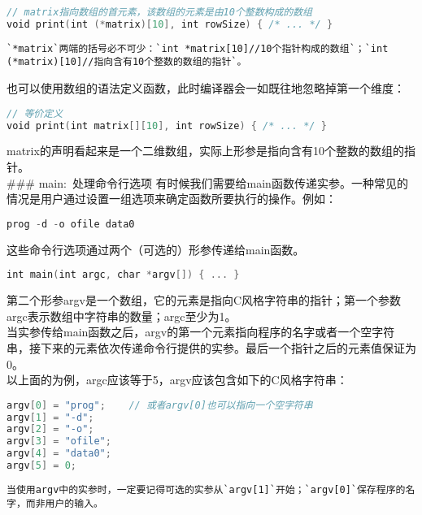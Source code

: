 \documentclass[
  a4paper,
  oneside,tablecaptionabove
]{scrbook}
\begin{document}
\begin{lstlisting}[language={C++}]
// matrix指向数组的首元素，该数组的元素是由10个整数构成的数组
void print(int (*matrix)[10], int rowSize) { /* ... */ }
\end{lstlisting}

\begin{lstlisting}
`*matrix`两端的括号必不可少：`int *matrix[10]//10个指针构成的数组`；`int (*matrix)[10]//指向含有10个整数的数组的指针`。
\end{lstlisting}

也可以使用数组的语法定义函数，此时编译器会一如既往地忽略掉第一个维度：

\begin{lstlisting}[language={C++}]
// 等价定义
void print(int matrix[][10], int rowSize) { /* ... */ }
\end{lstlisting}

matrix的声明看起来是一个二维数组，实际上形参是指向含有10个整数的数组的指针。\\
\#\#\# main:~处理命令行选项
有时候我们需要给main函数传递实参。一种常见的情况是用户通过设置一组选项来确定函数所要执行的操作。例如：

\begin{lstlisting}[language={C++}]
prog -d -o ofile data0
\end{lstlisting}

这些命令行选项通过两个（可选的）形参传递给main函数。

\begin{lstlisting}[language={C++}]
int main(int argc, char *argv[]) { ... }
\end{lstlisting}

第二个形参argv是一个数组，它的元素是指向C风格字符串的指针；第一个参数argc表示数组中字符串的数量；argc至少为1。\\
当实参传给main函数之后，argv的第一个元素指向程序的名字或者一个空字符串，接下来的元素依次传递命令行提供的实参。最后一个指针之后的元素值保证为0。\\
以上面的为例，argc应该等于5，argv应该包含如下的C风格字符串：

\begin{lstlisting}[language={C++}]
argv[0] = "prog";    // 或者argv[0]也可以指向一个空字符串
argv[1] = "-d";
argv[2] = "-o";
argv[3] = "ofile";
argv[4] = "data0";
argv[5] = 0;
\end{lstlisting}

\begin{lstlisting}
当使用argv中的实参时，一定要记得可选的实参从`argv[1]`开始；`argv[0]`保存程序的名字，而非用户的输入。
\end{lstlisting}
\end{document}
